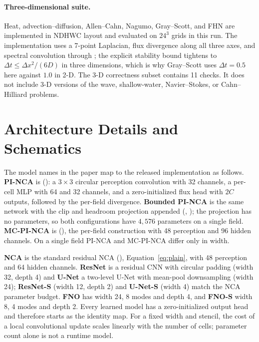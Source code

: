 \paragraph{Three-dimensional suite.}
Heat, advection--diffusion, Allen--Cahn, Nagumo, Gray--Scott, and FHN are implemented
in NDHWC layout and evaluated on $24^3$ grids in this run. The implementation uses a
7-point Laplacian, flux divergence along all three axes, and spectral convolution
through ; the explicit stability bound tightens to
$\Delta t\le\Delta x^2/(6D)$ in three dimensions, which is why Gray--Scott uses
$\Delta t=0.5$ here against $1.0$ in 2-D. The 3-D correctness subset contains 11 checks.
It does not include 3-D versions of the wave, shallow-water, Navier--Stokes, or
Cahn--Hilliard problems.

\section{Architecture Details and Schematics}
\label{sec:architecture-details}
The model names in the paper map to the released implementation as follows.
\textbf{PI-NCA} is  (): a $3\times3$ circular
perception convolution with 32 channels, a per-cell MLP with 64 and 32 channels, and a
zero-initialized flux head with $2C$ outputs, followed by the per-field divergence.
\textbf{Bounded PI-NCA} is the same network with the clip and headroom projection appended
(, ); the projection has no parameters,
so both configurations have $4{,}576$ parameters on a single field. \textbf{MC-PI-NCA} is
 (), the per-field construction with 48
perception and 96 hidden channels. On a single field PI-NCA and MC-PI-NCA differ only in
width.

\textbf{NCA} is the standard residual NCA (), Equation~\ref{eq:plain},
with 48 perception and 64 hidden channels. \textbf{ResNet} is a residual CNN with circular
padding (width 32, depth 4) and \textbf{U-Net} a two-level U-Net with mean-pool
downsampling (width 24); \textbf{ResNet-S} (width 12, depth 2) and \textbf{U-Net-S} (width
4) match the NCA parameter budget. \textbf{FNO} has width 24, 8 modes and depth 4, and
\textbf{FNO-S} width 8, 4 modes and depth 2. Every learned model has a zero-initialized
output head and therefore starts as the identity map. For a fixed width and stencil, the
cost of a local convolutional update scales linearly with the number of cells; parameter
count alone is not a runtime model.

